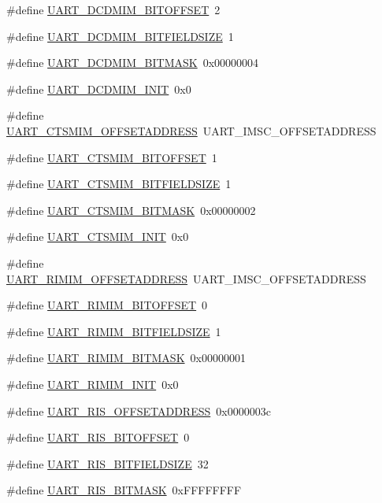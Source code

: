 \begin{DoxyCompactItemize}
\item 
\#define \hyperlink{a00575_a3b3b37dcaf687aba9115ae5c9fe1ad75}{UART\_\-DCDMIM\_\-BITOFFSET}~2
\item 
\#define \hyperlink{a00575_a24204eee4bbda19ae4ca00e626f6c0dd}{UART\_\-DCDMIM\_\-BITFIELDSIZE}~1
\item 
\#define \hyperlink{a00575_a1fcdab7ab856ea6c133b2e2d59afe7a0}{UART\_\-DCDMIM\_\-BITMASK}~0x00000004
\item 
\#define \hyperlink{a00575_a6142c696b9c75f3e0b1ef3f3fab506cc}{UART\_\-DCDMIM\_\-INIT}~0x0
\item 
\#define \hyperlink{a00575_a40bb9b77b52254d38e0392591c7be707}{UART\_\-CTSMIM\_\-OFFSETADDRESS}~UART\_\-IMSC\_\-OFFSETADDRESS
\item 
\#define \hyperlink{a00575_a3058d63c987a4de600b944774d163b95}{UART\_\-CTSMIM\_\-BITOFFSET}~1
\item 
\#define \hyperlink{a00575_a15b84173ce8292efc0d48599ff27069f}{UART\_\-CTSMIM\_\-BITFIELDSIZE}~1
\item 
\#define \hyperlink{a00575_acfe1ea3f8093c03b2d2f4486264fbbc8}{UART\_\-CTSMIM\_\-BITMASK}~0x00000002
\item 
\#define \hyperlink{a00575_a67b08e7711210e9f10ee00e81bf823d1}{UART\_\-CTSMIM\_\-INIT}~0x0
\item 
\#define \hyperlink{a00575_a25a05e0e62da784eba4f3766671d4093}{UART\_\-RIMIM\_\-OFFSETADDRESS}~UART\_\-IMSC\_\-OFFSETADDRESS
\item 
\#define \hyperlink{a00575_ad183710eb8e16ff70231631ca899e2d6}{UART\_\-RIMIM\_\-BITOFFSET}~0
\item 
\#define \hyperlink{a00575_ac40a12b61df41065b1f81b4b0e14c305}{UART\_\-RIMIM\_\-BITFIELDSIZE}~1
\item 
\#define \hyperlink{a00575_aba0bdb428f5a5119f7a8e44fbc458bb5}{UART\_\-RIMIM\_\-BITMASK}~0x00000001
\item 
\#define \hyperlink{a00575_a45229e1cc076b48d4ee22a000d96c3a7}{UART\_\-RIMIM\_\-INIT}~0x0
\item 
\#define \hyperlink{a00575_a0a2b08b08144ce3acb5f5862ac3594a8}{UART\_\-RIS\_\-OFFSETADDRESS}~0x0000003c
\item 
\#define \hyperlink{a00575_a7ab75cea1b76edcc977e3ef44869375c}{UART\_\-RIS\_\-BITOFFSET}~0
\item 
\#define \hyperlink{a00575_a51440eee5cfe8c151858b2808dc9a09b}{UART\_\-RIS\_\-BITFIELDSIZE}~32
\item 
\#define \hyperlink{a00575_ae977cd3d0eb77466e8fef9382aa0ea98}{UART\_\-RIS\_\-BITMASK}~0xFFFFFFFF

\end{DoxyCompactItemize}

